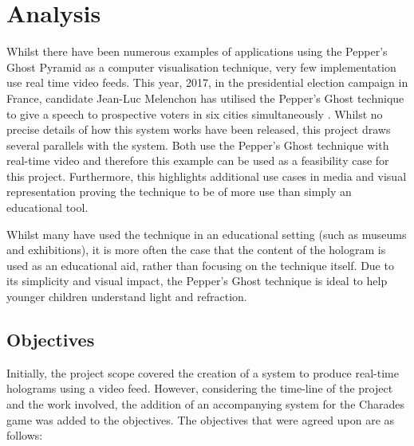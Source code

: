 \section{Analysis}
Whilst there have been numerous examples of applications using the Pepper's Ghost Pyramid as a computer visualisation technique, very few implementation use real time video feeds. This year, 2017, in the presidential election campaign in France, candidate Jean-Luc Melenchon has utilised the Pepper's Ghost technique to give a speech to prospective voters in six cities simultaneously \cite{french_elections}. Whilst no precise details of how this system works have been released, this project draws several parallels with the system. Both use the Pepper's Ghost technique with real-time video and therefore this example can be used as a feasibility case for this project. Furthermore, this highlights additional use cases in media and visual representation proving the technique to be of more use than simply an educational tool.

Whilst many have used the technique in an educational setting (such as museums and exhibitions), it is more often the case that the content of the hologram is used as an educational aid, rather than focusing on the technique itself. Due to its simplicity and visual impact, the Pepper's Ghost technique is ideal to help younger children understand light and refraction.  

\subsection{Objectives}
Initially, the project scope covered the creation of a system to produce real-time holograms using a video feed. However, considering the time-line of the project and the work involved, the addition of an accompanying system for the Charades game was added to the objectives. The objectives that were agreed upon are as follows:

